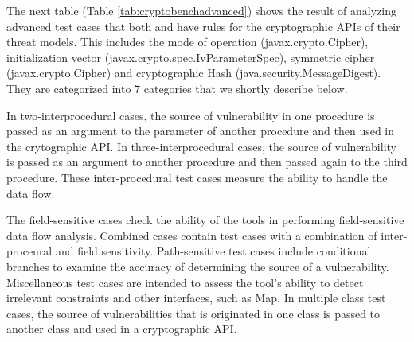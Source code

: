 The next table (Table \ref{tab:cryptobenchadvanced}) shows the result of analyzing \cryptoapibench{} advanced test cases that both \codyze{} and \cognicryptsast{} have rules for the cryptographic APIs of their threat models. This includes the mode of operation (javax.crypto.Cipher), initialization vector (javax.crypto.spec.IvParameterSpec), symmetric cipher (javax.crypto.Cipher) and cryptographic Hash (java.security.MessageDigest). They are categorized into 7 categories that we shortly describe below.

In two-interprocedural cases, the source of vulnerability in one procedure is passed as an argument to the parameter of another procedure and then used in the crytographic API.
In three-interprocedural cases, the source of vulnerability is passed as an argument to another procedure and then passed again to the third procedure. These inter-procedural test cases measure the ability to handle the data flow. 

The field-sensitive cases check the ability of the tools in performing field-sensitive data flow analysis. Combined cases contain test cases with a combination of inter-proceural and field sensitivity. Path-sensitive test cases include conditional branches to examine the accuracy of determining the source of a vulnerability. Miscellaneous test cases are intended to assess the tool's ability to detect irrelevant constraints and other interfaces, such as Map. In multiple class test cases, the source of vulnerabilities that is originated in one class is passed to another class and used in a cryptographic API.



